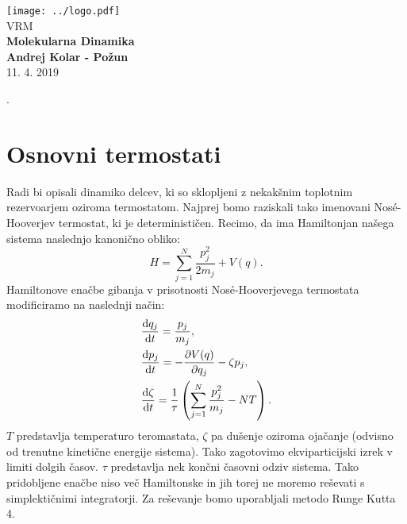 \documentclass{article}
\begin{document}
\begin{titlepage}
    \begin{center}
        \vspace*{1cm}
        \Large
\texttt{[image: ../logo.pdf]}\\
        \Large
\vspace{1cm}
        VRM\\
        \huge
        \textbf{Molekularna Dinamika\\}
\Large  
        \vspace{1cm}
        \textbf{Andrej Kolar - Po{\v z}un\\}
        \vspace{0.8cm}
 11. 4. 2019

\vfill
\normalsize
\end{center}. 
\end{titlepage}
\newpage
{}
\section*{Osnovni termostati}

Radi bi opisali dinamiko delcev, ki so sklopljeni z nekakšnim toplotnim rezervoarjem oziroma termostatom. Najprej bomo raziskali tako imenovani  Nosé-Hooverjev termostat, ki je determinističen. Recimo, da ima Hamiltonjan našega sistema naslednjo kanonično obliko:
\begin{equation*}
H = \sum_{j=1}^N \frac{p_j^2}{2 m_j} + V(q).
\end{equation*}
Hamiltonove enačbe gibanja v prisotnosti Nosé-Hooverjevega termostata modificiramo na naslednji način:
\begin{align*}
&\frac{\textup{d} q_j}{\textup{d}t} = \frac{p_j}{m_j}, \\
&\frac{\textup{d}p_j}{\textup{d}t} = - \frac{\partial V(q)}{\partial q_j}  - \zeta p_j, \\
&\frac{\textup{d} \zeta}{\textup{d}t} = \frac{1}{\tau} \left( \sum_{j=1}^N \frac{p_j^2}{m_j} - N T \right).
\end{align*}
$T$ predstavlja temperaturo teromastata, $\zeta$ pa dušenje oziroma ojačanje (odvisno od trenutne kinetične energije sistema). Tako zagotovimo ekviparticijski izrek v limiti dolgih časov. $\tau$ predstavlja nek končni časovni odziv sistema.
Tako pridobljene enačbe niso več Hamiltonske in jih torej ne moremo reševati s simplektičnimi integratorji. Za reševanje bomo uporabljali metodo Runge Kutta 4.
\end{document}
